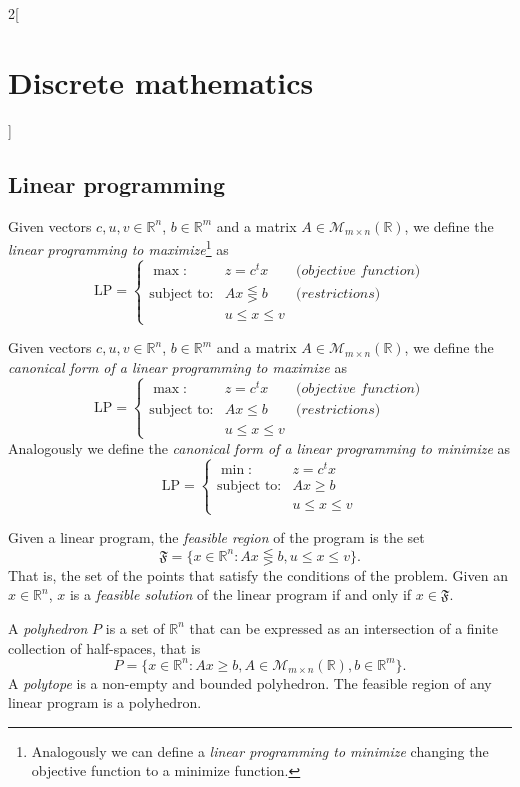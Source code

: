 \documentclass[class=article,10pt,crop=false]{standalone}
\begin{document}
\begin{multicols}{2}[\section{Discrete mathematics}]
\subsection{Linear programming}
\begin{definition}
Given vectors $c,u,v\in\mathbb{R}^n$, $b\in\mathbb{R}^m$ and a matrix $A\in\mathcal{M}_{m\times n}(\mathbb{R})$, we define the \textit{linear programming to maximize}\footnote{Analogously we can define a \textit{linear programming to minimize} changing the objective function to a minimize function.} as $$\text{LP}=\left\{\begin{array}{rcl}
    \max: & z=c^tx & \textit{(objective function)} \\
    \text{subject to}: & Ax\lesseqgtr b & \textit{(restrictions)}\\
     & u\leq x\leq v & 
    \end{array}\right.$$
\end{definition}
\begin{definition}
Given vectors $c,u,v\in\mathbb{R}^n$, $b\in\mathbb{R}^m$ and a matrix $A\in\mathcal{M}_{m\times n}(\mathbb{R})$, we define the \textit{canonical form of a linear programming to maximize} as $$\text{LP}=\left\{\begin{array}{rcl}
    \max: & z=c^tx & \textit{(objective function)} \\
    \text{subject to}: & Ax\leq b & \textit{(restrictions)}\\
     & u\leq x\leq v & 
    \end{array}\right.$$
Analogously we define the \textit{canonical form of a linear programming to minimize} as $$\text{LP}=\left\{\begin{array}{rc}
    \min: & z=c^tx \\
    \text{subject to}: & Ax\geq b\\
     & u\leq x\leq v
    \end{array}\right.$$
\end{definition}
\begin{definition}
Given a linear program, the \textit{feasible region} of the program is the set $$\mathfrak{F}=\{x\in\mathbb{R}^n:Ax\lesseqgtr b,u\leq x\leq v\}.$$ That is, the set of the points that satisfy the conditions of the problem. Given an $x\in\mathbb{R}^n$, $x$ is a \textit{feasible solution} of the linear program if and only if $x\in\mathfrak{F}$.
\end{definition}
\begin{definition}
A \textit{polyhedron} $P$ is a set of $\mathbb{R}^n$ that can be expressed as an intersection of a finite collection of half-spaces, that is $$P=\{x\in\mathbb{R}^n:Ax\geq b, A\in\mathcal{M}_{m\times n}(\mathbb{R}),b\in\mathbb{R}^m\}.$$ A \textit{polytope} is a non-empty and bounded polyhedron. The feasible region of any linear program is a polyhedron.

\end{definition}
\end{multicols}
\end{document}
